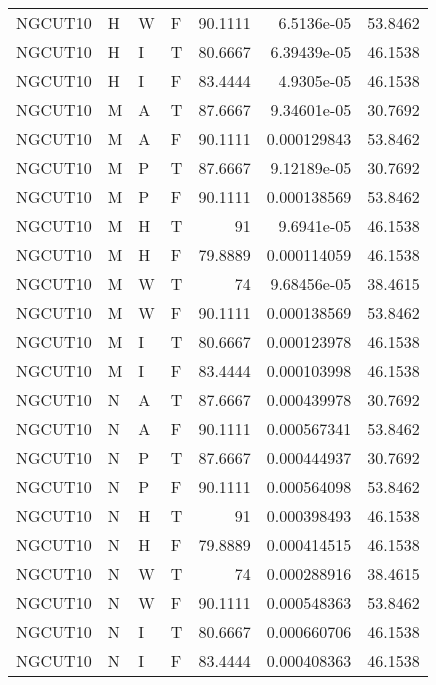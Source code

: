 \begin{table}[htb!]
{\begin{tabular}{llllrrr}
            NGCUT10  & H     & W     & F          & 90.1111    & 6.5136e-05  & 53.8462  \\
            NGCUT10  & H     & I     & T          & 80.6667    & 6.39439e-05 & 46.1538  \\
            NGCUT10  & H     & I     & F          & 83.4444    & 4.9305e-05  & 46.1538  \\
            NGCUT10  & M     & A     & T          & 87.6667    & 9.34601e-05 & 30.7692  \\
            NGCUT10  & M     & A     & F          & 90.1111    & 0.000129843 & 53.8462  \\
            NGCUT10  & M     & P     & T          & 87.6667    & 9.12189e-05 & 30.7692  \\
            NGCUT10  & M     & P     & F          & 90.1111    & 0.000138569 & 53.8462  \\
            NGCUT10  & M     & H     & T          & 91         & 9.6941e-05  & 46.1538  \\
            NGCUT10  & M     & H     & F          & 79.8889    & 0.000114059 & 46.1538  \\
            NGCUT10  & M     & W     & T          & 74         & 9.68456e-05 & 38.4615  \\
            NGCUT10  & M     & W     & F          & 90.1111    & 0.000138569 & 53.8462  \\
            NGCUT10  & M     & I     & T          & 80.6667    & 0.000123978 & 46.1538  \\
            NGCUT10  & M     & I     & F          & 83.4444    & 0.000103998 & 46.1538  \\
            NGCUT10  & N     & A     & T          & 87.6667    & 0.000439978 & 30.7692  \\
            NGCUT10  & N     & A     & F          & 90.1111    & 0.000567341 & 53.8462  \\
            NGCUT10  & N     & P     & T          & 87.6667    & 0.000444937 & 30.7692  \\
            NGCUT10  & N     & P     & F          & 90.1111    & 0.000564098 & 53.8462  \\
            NGCUT10  & N     & H     & T          & 91         & 0.000398493 & 46.1538  \\
            NGCUT10  & N     & H     & F          & 79.8889    & 0.000414515 & 46.1538  \\
            NGCUT10  & N     & W     & T          & 74         & 0.000288916 & 38.4615  \\
            NGCUT10  & N     & W     & F          & 90.1111    & 0.000548363 & 53.8462  \\
            NGCUT10  & N     & I     & T          & 80.6667    & 0.000660706 & 46.1538  \\
            NGCUT10  & N     & I     & F          & 83.4444    & 0.000408363 & 46.1538  \\
            \hline
        \end{tabular}
    }{
    }
\end{table} 
